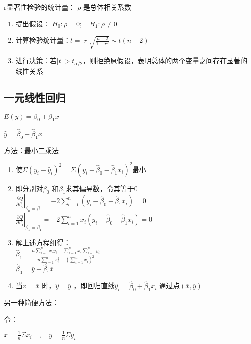 \documentclass[UTF8,10pt]{book}
\begin{document}
r显著性检验的统计量： \(\rho\) 是总体相关系数

\begin{enumerate}
	\def\labelenumi{\arabic{enumi}.}
	\item
	提出假设： \( H_0:\rho=0; \quad H_1:\rho\neq 0 \)
	\item
	计算检验统计量：\( t = |r| \sqrt{  \frac{n-2}{1-r^2}   }   \sim t(n-2) \)
	\item
	进行决策：若\(|t|>t_{\alpha / 2}\)，则拒绝原假设，表明总体的两个变量之间存在显著的线性关系
\end{enumerate}

\subsection{一元线性回归}\label{header-n79}

\( E(y) = \beta_0 + \beta_1 x  \)

\( \hat{y} = \hat{\beta}_0 + \hat{\beta}_1 x \)

方法：最小二乘法

\begin{enumerate}
	\def\labelenumi{\arabic{enumi}.}
	\item
	使\(\Sigma(y_i - \hat{y}_i)^2 = \Sigma(y_i - \hat{\beta}_0 - \hat{\beta}_1 x_i)^2\)最小
	\item
	即分别对\(\beta_{0}\) 和\(\beta_{1}\)求其偏导数，令其等于0\\
	\( \left.   \frac{\partial Q}{\partial \beta_0}\right|_{\beta_0 = \hat{\beta}_0}  = -2 \sum_{i=1}^n (y_i - \hat{\beta}_0 - \hat{\beta}_1 x_i) = 0   \)\\
	\( \left.   \frac{\partial Q}{\partial \beta_1}\right|_{\beta_1 = \hat{\beta}_1}  = -2 \sum_{i=1}^n x_i(y_i - \hat{\beta}_0 - \hat{\beta}_1 x_i) = 0   \)
	\item
	解上述方程组得：\\
	\( \hat{\beta}_1 = \frac{n \sum_{i=1}^n x_i y_i - \sum_{i=1}^n x_i \sum_{i=1}^n y_i}{n \sum_{i=1}^n x_i^2 - \left(\sum_{i=1}^n x_i\right)^2}    \)
	\\
	\(\hat{\beta}_{0} = \overline{y} - \hat{\beta}_1 \overline{x}\)
	\item
	当\(x=\overline{x}\) 时，\(\hat{y}=\overline{y}\)
	，即回归直线\(\hat{y}_i=\hat{\beta}_0+\hat{\beta}_1 x_i\)
	通过点\((\overline{x},\overline{y})\)
\end{enumerate}

另一种简便方法：

令：

\(  \overline{x}=\frac{1}{n}\Sigma x_i   \quad , \quad \overline{y}=\frac{1}{n}\Sigma y_i \)
\end{document}
